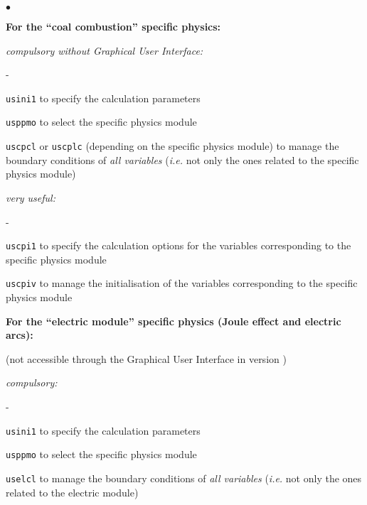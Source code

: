 {{{\begin{list}{$\bullet$}{}
\begin{list}{}{}
  \item{\bf For the ``coal combustion'' specific physics:}

    \begin{list}{}{}
        \item {\em compulsory without Graphical User Interface:}
        \begin{list}{-}{}
            \item \texttt{usini1} to specify the calculation parameters

            \item \texttt{usppmo} to select the specific physics module

            \item \texttt{uscpcl} or \texttt{uscplc} (depending on the
                  specific physics module) to manage the
                  boundary conditions of {\em all variables} ({\em i.e.} not only
              the ones related to the specific physics module)
        \end{list}

        \item {\em very useful:}
        \begin{list}{-}{}
            \item  \texttt{uscpi1}
               to specify the calculation options
                   for the variables
                   corresponding to the specific physics module

            \item \texttt{uscpiv} to manage the initialisation of the
                   variables corresponding to the specific physics module
        \end{list}
    \end{list}

     \item{\bf For the ``electric module'' specific physics
      (Joule effect and electric arcs):}

(not accessible through the Graphical User Interface in version \verscs)
    \begin{list}{}{}
       \item {\em compulsory:}
        \begin{list}{-}{}
            \item \texttt{usini1} to specify the calculation parameters

            \item \texttt{usppmo} to select the specific physics module

            \item \texttt{uselcl} to manage the boundary conditions of {\em all
              variables} ({\em i.e.} not only
              the ones related to the electric module)


\end{list}
\end{list}
\end{list}
\end{list}}}}
